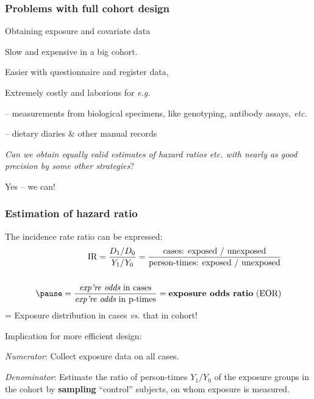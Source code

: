 \documentclass[12pt,dvipsnames,t,handout%
,aspectratio=169%
]{beamer}
\newcommand{\bes}{\begin{eqnarray*}}
\newcommand{\ees}{\end{eqnarray*}}
\begin{document}
\begin{comment}
\end{comment}

\begin{frame}
\frametitle{Problems with full cohort design}


Obtaining exposure and covariate data
\pause
\bi
\item Slow and expensive in a big cohort. \pause
\item Easier with questionnaire and register data, \pause
\item Extremely costly and laborious for {\it e.g.} 
\bi
{\normalsize
\item[--]   measurements from biological specimens, 
    like genotyping, antibody assays, {\it etc.} %
    \medskip
\item[--] dietary diaries \& other manual records
}
\ei
\ei
\pause

\emph{ Can we obtain equally valid estimates of hazard ratios
etc. with nearly as good precision by some other
strategies}? 
\pause

\medskip
Yes -- we can!

\end{frame}

\begin{frame}
\frametitle{Estimation of hazard ratio}

The incidence rate ratio can be expressed:
\pause
\bes
   \text{IR} =  \frac{ D_1/ D_0 }{ Y_1 / Y_0 }  
    =  \frac{\text{cases: exposed / unexposed}}
				    {\text{person-times: exposed / unexposed}}
				    \\ { } \\ 
	  \pause			    
              =  \frac{\textit{exp're odds} \text{ in cases}}
                 {\textit{exp're odds} \text{ in p-times}}   
             = \textbf{exposure odds ratio} \text{ (EOR)}  
\ees
\pause
= Exposure distribution in cases {\it vs.} that in cohort!

\pause
\bigskip
Implication for more efficient design: 
\pause
\bi 
\item {\it Numerator}: Collect exposure data on all cases. \pause
\item {\it Denominator}: Estimate the ratio of
person-times $Y_1/Y_0$ of the exposure groups in the cohort by
\textbf{sampling}  ``control'' subjects,
 on whom exposure is measured. 
\ei
\end{frame}  
 
\end{document}
